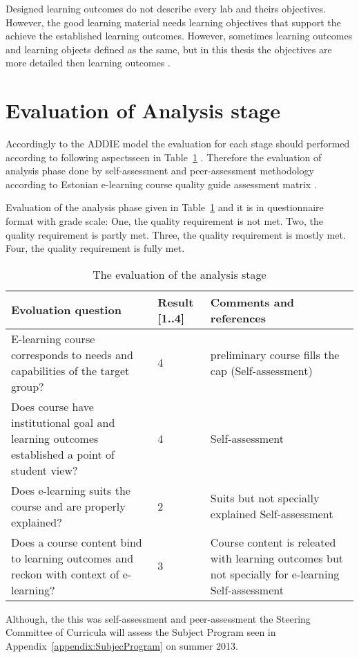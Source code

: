 Designed learning outcomes do not describe every lab and theirs objectives. However, the good learning material needs learning objectives that support the achieve the established learning outcomes. However, sometimes learning outcomes and learning objects defined as the same, but in this thesis the objectives are more detailed then learning outcomes \citep{website:objective_vs_outcome}.

\section{Evaluation of Analysis stage}

Accordingly to the \gls{ADDIE} model the evaluation for each stage should performed according to following aspectsseen in Table~\ref{tab:evoluation_analysis} \citep[p.~11]{OppeArenduskeskus2010}. Therefore the evaluation of analysis phase done by self-assessment and peer-assessment methodology according to Estonian e-learning course quality guide assessment matrix \citep{website:quality_mx}.

Evaluation of the analysis phase given in Table~\ref{tab:evoluation_analysis} and it is in questionnaire format with grade scale: One, the quality requirement is not met. Two, the quality requirement is partly met. Three, the quality requirement is mostly met. Four, the quality requirement is fully met.

\begin{table}[h]
\centering
\caption{The evaluation of the analysis stage }
{ \small 
\begin{tabular}{|p{6cm}|p{2cm}|p{5cm}|}
\hline 
\color{blue} Evoluation question & \color{blue} Result [1..4] & \color{blue} Comments and references \\ 
\hline
E-learning course corresponds to needs and capabilities of the target group? 
& 4  &  preliminary course fills the cap (Self-assessment)\\ 
\hline 
Does course have institutional goal and learning outcomes established a point of student view?
& 4 & Self-assessment  \\ 
\hline 
Does e-learning suits the course and are properly explained?
& 2 & Suits but not specially explained Self-assessment \\ 
\hline
Does a course content bind to learning outcomes and reckon with context of e-learning?
& 3 & Course content is releated with learning outcomes but not specially for e-learning Self-assessment \\ 
\hline 
\end{tabular} 
}
\label{tab:evoluation_analysis}
\end{table}

Although, the this was self-assessment and peer-assessment the Steering Committee of Curricula will assess the Subject Program seen in Appendix~\ref{appendix:SubjecProgram} on summer 2013.

%
%
%

